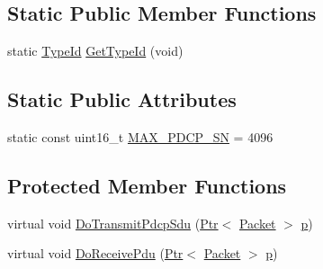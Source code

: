 \subsection*{Static Public Member Functions}
\begin{DoxyCompactItemize}
\item 
static \hyperlink{classns3_1_1TypeId}{Type\+Id} \hyperlink{classns3_1_1LtePdcp_ae8f950b7225fc76436ba9418f81cdf53}{Get\+Type\+Id} (void)
\end{DoxyCompactItemize}
\subsection*{Static Public Attributes}
\begin{DoxyCompactItemize}
\item 
static const uint16\+\_\+t \hyperlink{classns3_1_1LtePdcp_a327ef6a5d07120c39d9ee0acebc8b741}{M\+A\+X\+\_\+\+P\+D\+C\+P\+\_\+\+SN} = 4096
\end{DoxyCompactItemize}
\subsection*{Protected Member Functions}
\begin{DoxyCompactItemize}
\item 
virtual void \hyperlink{classns3_1_1LtePdcp_ab7db54201309ecb2358b8ae9cff7e4cc}{Do\+Transmit\+Pdcp\+Sdu} (\hyperlink{classns3_1_1Ptr}{Ptr}$<$ \hyperlink{classns3_1_1Packet}{Packet} $>$ \hyperlink{lte__link__budget__x2__handover__measures_8m_ac9de518908a968428863f829398a4e62}{p})
\item 
virtual void \hyperlink{classns3_1_1LtePdcp_a39ec507fd59bc8e650738717b4a471e5}{Do\+Receive\+Pdu} (\hyperlink{classns3_1_1Ptr}{Ptr}$<$ \hyperlink{classns3_1_1Packet}{Packet} $>$ \hyperlink{lte__link__budget__x2__handover__measures_8m_ac9de518908a968428863f829398a4e62}{p})
\end{DoxyCompactItemize}

